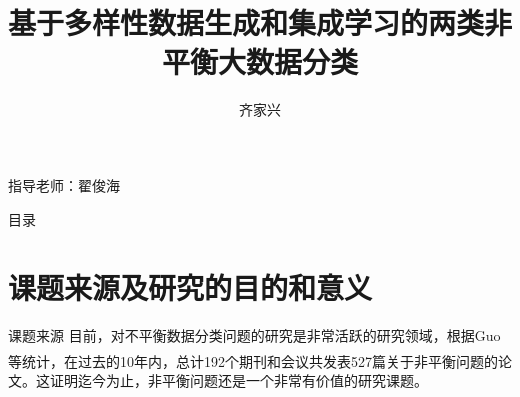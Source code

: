\documentclass{beamer}
\author{齐家兴}
\title{基于多样性数据生成和集成学习的两类非平衡大数据分类}
\institute {\large河北大学数学与信息科学学院}
\newcommand{\upcite}[1]{\textsuperscript{\textsuperscript{\cite{#1}}}} %
\begin{document}

\begin{frame}
    \titlepage
    \begin{flushright}
        指导老师：翟俊海
    \end{flushright}
\end{frame}

\begin{frame}{目录}
    \tableofcontents
\end{frame}

\section{课题来源及研究的目的和意义}
\begin{frame}{课题来源}\pause
    目前，对不平衡数据分类问题的研究是非常活跃的研究领域，根据Guo等\upcite{haixiang2017learning}统计，在过去的10年内，总计192个期刊和会议共发表527篇关于非平衡问题的论文。这证明迄今为止，非平衡问题还是一个非常有价值的研究课题。
    
\end{frame}
\end{document}
